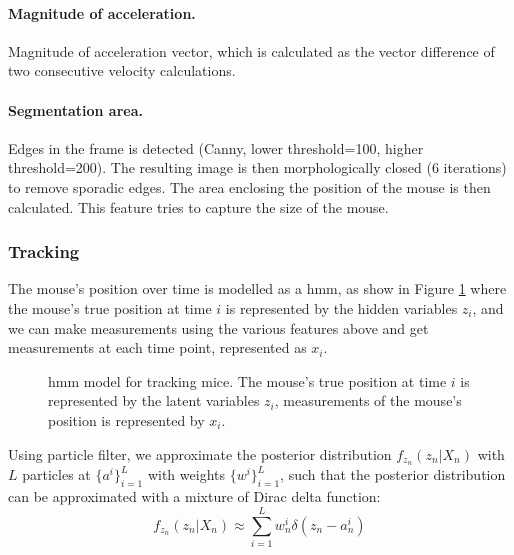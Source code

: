 \paragraph{Magnitude of acceleration.} Magnitude of acceleration vector, which is calculated as the vector difference of two consecutive velocity calculations. 

\paragraph{Segmentation area.} Edges in the frame is detected (Canny, lower threshold=100, higher threshold=200). The resulting image is then morphologically closed (6 iterations) to remove sporadic edges. The area enclosing the position of the mouse is then calculated. This feature tries to capture the size of the mouse.

\subsubsection{Tracking}

The mouse's position over time is modelled as a \gls{hmm}, as show in Figure \ref{f.ad.hmm} where the mouse's true position at time $i$ is represented by the hidden variables $z_i$, and we can make measurements using the various features above and get measurements at each time point, represented as $x_i$. 

\begin{figure}[h]
    
    \caption{\gls{hmm} model for tracking mice. The mouse's true position at time $i$ is represented by the latent variables $z_i$, measurements of the mouse's position is represented by $x_i$. \label{f.ad.hmm}}
\end{figure}

Using particle filter, we approximate the posterior distribution $f_{z_n}(z_n|X_n)$ with $L$ particles at $\{a^i\}_{i=1}^L$ with weights $\{w^i\}_{i=1}^L$, such that the posterior distribution can be approximated with a mixture of Dirac delta function: 
\begin{equation} \label{zn_approx}
    f_{z_n}(z_n|X_n) \approx \sum_{i=1}^Lw_n^i\delta(z_n - a_n^i)
\end{equation}

